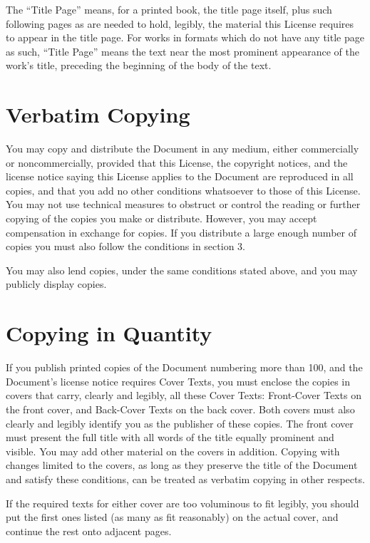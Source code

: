 The ``Title Page'' means, for a printed book, the title page itself,
plus such following pages as are needed to hold, legibly, the material
this License requires to appear in the title page.  For works in
formats which do not have any title page as such, ``Title Page'' means
the text near the most prominent appearance of the work's title,
preceding the beginning of the body of the text.


\section{Verbatim Copying}

You may copy and distribute the Document in any medium, either
commercially or noncommercially, provided that this License, the
copyright notices, and the license notice saying this License applies
to the Document are reproduced in all copies, and that you add no other
conditions whatsoever to those of this License.  You may not use
technical measures to obstruct or control the reading or further
copying of the copies you make or distribute.  However, you may accept
compensation in exchange for copies.  If you distribute a large enough
number of copies you must also follow the conditions in section 3.

You may also lend copies, under the same conditions stated above, and
you may publicly display copies.


\section{Copying in Quantity}

If you publish printed copies of the Document numbering more than 100,
and the Document's license notice requires Cover Texts, you must enclose
the copies in covers that carry, clearly and legibly, all these Cover
Texts: Front-Cover Texts on the front cover, and Back-Cover Texts on
the back cover.  Both covers must also clearly and legibly identify
you as the publisher of these copies.  The front cover must present
the full title with all words of the title equally prominent and
visible.  You may add other material on the covers in addition.
Copying with changes limited to the covers, as long as they preserve
the title of the Document and satisfy these conditions, can be treated
as verbatim copying in other respects.

If the required texts for either cover are too voluminous to fit
legibly, you should put the first ones listed (as many as fit
reasonably) on the actual cover, and continue the rest onto adjacent
pages.

